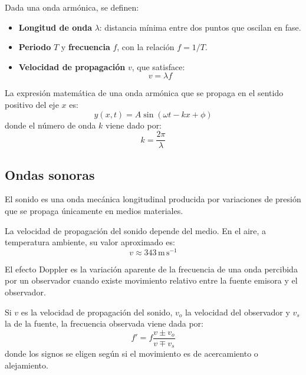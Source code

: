 \documentclass[10pt]{article}
\begin{document}
Dada una onda armónica, se definen:
\begin{itemize}
  \item \textbf{Longitud de onda} $\lambda$: distancia mínima entre dos puntos que oscilan en fase.
  \item \textbf{Periodo} $T$ y \textbf{frecuencia} $f$, con la relación $f = 1/T$.
  \item \textbf{Velocidad de propagación} $v$, que satisface:
    \[ v = \lambda f \]
\end{itemize}

\begin{definition}
  La expresión matemática de una onda armónica que se propaga en el sentido positivo del eje $x$ es:
  \[ y(x,t) = A \sin(\omega t - kx + \phi) \]
  donde el número de onda $k$ viene dado por:
  \[ k = \frac{2\pi}{\lambda} \]
\end{definition}

\subsection{Ondas sonoras}

\begin{definition}
  El sonido es una onda mecánica longitudinal producida por variaciones de presión que se propaga únicamente en medios materiales.
\end{definition}

\begin{remark}
  La velocidad de propagación del sonido depende del medio. En el aire, a temperatura ambiente, su valor aproximado es:
  \[ v \approx 343\,\mathrm{m\,s^{-1}} \]
\end{remark}

\begin{definition}
  El efecto Doppler es la variación aparente de la frecuencia de una onda percibida por un observador cuando existe movimiento relativo entre la fuente emisora y el observador.
\end{definition}

\begin{theorem}
  Si $v$ es la velocidad de propagación del sonido, $v_o$ la velocidad del observador y $v_s$ la de la fuente, la frecuencia observada viene dada por:
  \[ f' = f \frac{v \pm v_o}{v \mp v_s} \]
  donde los signos se eligen según si el movimiento es de acercamiento o alejamiento.
\end{theorem}
\end{document}
